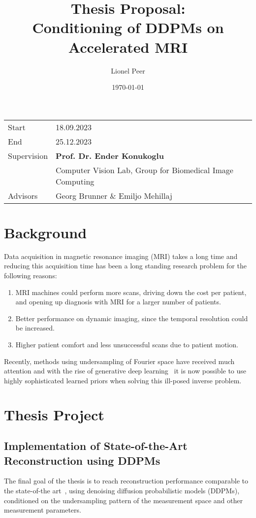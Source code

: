 \documentclass[a4paper]{article}
\title{Thesis Proposal:\\Conditioning of DDPMs on Accelerated MRI}
\author{Lionel Peer}
\date{\today}
\begin{document}
\maketitle
\vfill
\begin{tabular}{l l}
    Start       & 18.09.2023                                                \\
    End         & 25.12.2023                                                \\
    Supervision & \textbf{Prof. Dr. Ender Konukoglu}                        \\
                & Computer Vision Lab, Group for Biomedical Image Computing \\
    Advisors    & Georg Brunner \& Emiljo Mehillaj
\end{tabular}
\tableofcontents
\newpage

\section{Background}
Data acquisition in magnetic resonance imaging (MRI) takes a long time and reducing this acquisition time has been a long standing research problem for the following reasons:
\begin{enumerate}
    \item MRI machines could perform more scans, driving down the cost per patient, and opening up diagnosis with MRI for a larger number of patients.
    \item Better performance on dynamic imaging, since the temporal resolution could be increased.
    \item Higher patient comfort and less unsuccessful scans due to patient motion.
\end{enumerate}
Recently, methods using undersampling of Fourier space have received much attention and with the rise of generative deep learning~\cite{kingma2022autoencoding,goodfellow2014generative,ho2020denoising} it is now possible to use highly sophisticated learned priors when solving this ill-posed inverse problem.

\section{Thesis Project}

\subsection{Implementation of State-of-the-Art Reconstruction using DDPMs}
The final goal of the thesis is to reach reconstruction performance comparable to the state-of-the art~\cite{10.1007/978-3-031-16446-0_62}, using denoising diffusion probabilistic models (DDPMs), conditioned on the undersampling pattern of the measurement space and other measurement parameters.
\end{document}
